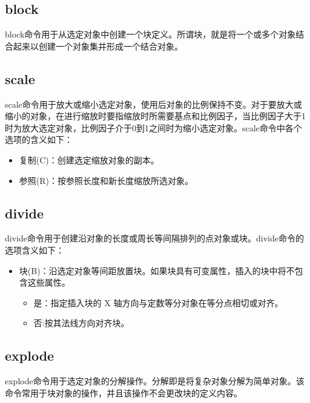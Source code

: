 \subsection{block}
block命令用于从选定对象中创建一个块定义。所谓块，就是将一个或多个对象结合起来以创建一个对象集并形成一个结合对象。
\subsection{scale}
scale命令用于放大或缩小选定对象，使用后对象的比例保持不变。对于要放大或缩小的对象，在进行缩放时要指缩放时所需要基点和比例因子，当比例因子大于1时为放大选定对象，比例因子介于0到1之间时为缩小选定对象。scale命令中各个选项的含义如下：
\begin{itemize}
\item 复制(C)：创建选定缩放对象的副本。
\item 参照(R)：按参照长度和新长度缩放所选对象。
\end{itemize}
\subsection{divide}
divide命令用于创建沿对象的长度或周长等间隔排列的点对象或块。divide命令的选项含义如下：
\begin{itemize}
\item 块(B)：沿选定对象等间距放置块。如果块具有可变属性，插入的块中将不包含这些属性。 
\begin{itemize}
\item 是：指定插入块的 X 轴方向与定数等分对象在等分点相切或对齐。
\item 否:按其法线方向对齐块。
\end{itemize} 
\end{itemize}
\subsection{explode}
explode命令用于选定对象的分解操作。分解即是将复杂对象分解为简单对象。该命令常用于块对象的操作，并且该操作不会更改块的定义内容。
